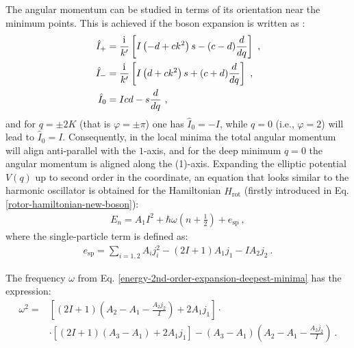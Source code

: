 The angular momentum can be studied in terms of its orientation near the minimum points. This is achieved if the boson expansion is written as \cite{raduta2020new}:
\begin{align}
    \hat{I}_+&=\frac{\iu}{k'}\left[I\left(-d+ck^2\right)s-(c-d)\frac{d}{dq}\right]\ ,\nonumber\\
    \hat{I}_-&=\frac{\iu}{k'}\left[I\left(d+ck^2\right)s+(c+d)\frac{d}{dq}\right]\ ,\nonumber\\
    \hat{I}_0&=Icd-s\frac{d}{dq}\ ,
\end{align}
and for $q=\pm2K$ (that is $\varphi=\pm\pi$) one has $\hat{I}_0=-I$, while $q=0$ (i.e., $\varphi=2$) will lead to $\hat{I}_0=I$. Consequently, in the local minima the total angular momentum will align anti-parallel with the $1$-axis, and for the deep minimum $q=0$ the angular momentum is aligned along the (1)-axis. Expanding the elliptic potential $V(q)$ up to second order in the coordinate, an equation that looks similar to the harmonic oscillator is obtained for the Hamiltonian $\hat{H}_\text{rot}$ (firstly introduced in Eq. \ref{rotor-hamiltonian-new-boson}):
\begin{align}
    E_n=A_1I^2+\hbar\omega\left(n+\frac{1}{2}\right)+e_\text{sp}\ ,
    \label{energy-2nd-order-expansion-deepest-minima}
\end{align}
where the single-particle term is defined as:
\begin{align}
    e_\text{sp}=\sum_{i=1,2}A_ij_i^2-(2I+1)A_1j_1-IA_2j_2\ .
\end{align}

The frequency $\omega$ from Eq. \ref{energy-2nd-order-expansion-deepest-minima} has the expression:
\begin{align}
    \omega^2=&\left[(2I+1)\left(A_2-A_1-\frac{A_2j_2}{I}\right)+2A_1j_1\right]\cdot\nonumber\\
    &\cdot\left[(2I+1)(A_3-A_1)+2A_1j_1\right]-(A_3-A_1)\left(A_2-A_1-\frac{A_2j_2}{I}\right)\ .
    \label{omega-frequency-deepest-minima}
\end{align}

    
